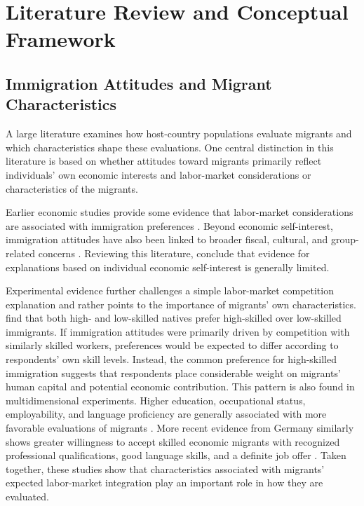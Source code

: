 \section{Literature Review and Conceptual Framework}

\subsection{Immigration Attitudes and Migrant Characteristics}

A large literature examines how host-country populations evaluate migrants and which characteristics shape 
these evaluations. One central distinction in this literature is based on whether attitudes toward migrants 
primarily reflect individuals' own economic interests and labor-market considerations or characteristics of the migrants.

Earlier economic studies provide some evidence that labor-market considerations are associated with 
immigration preferences \citep[e.g.,][]{scheve2001labor, mayda2006against}. Beyond economic self-interest, immigration 
attitudes have also been linked to broader fiscal, cultural, and group-related concerns \citep{burns2000economic, dustmann2007racial, sides2007european}. 
Reviewing this literature, \citet{hainmueller2014public} conclude that evidence for explanations based on 
individual economic self-interest is generally limited.

Experimental evidence further challenges a simple labor-market competition explanation and rather points to the 
importance of migrants' own characteristics. \citet{hainmueller2010attitudes} find that both high- and low-skilled 
natives prefer high-skilled over low-skilled immigrants. If immigration attitudes were primarily driven by 
competition with similarly skilled workers, preferences would be expected to differ according to respondents' 
own skill levels. Instead, the common preference for high-skilled immigration suggests that respondents place 
considerable weight on migrants' human capital and potential economic contribution. This pattern is also found in 
multidimensional experiments. Higher education, occupational status, employability, and language proficiency are 
generally associated with more favorable evaluations of migrants \citep{hainmueller2015hidden, bansak2016economic,czymara2016deutschland}. 
More recent evidence from Germany similarly shows greater willingness to accept 
skilled economic migrants with recognized professional qualifications, good language skills, and a definite job offer 
\citep{wolff2025skilled}. Taken together, these studies show that characteristics associated with migrants' expected 
labor-market integration play an important role in how they are evaluated.

